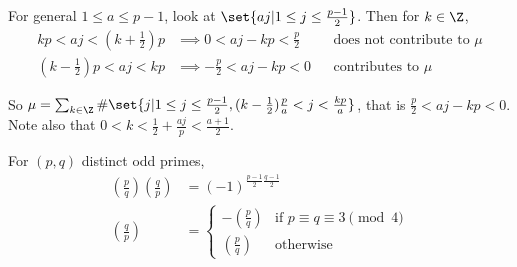 \documentclass{article}
\newcommand{\legendre}[2]{\genfrac{(}{)}{}{}{#1}{#2}}
\begin{document}
For general $1 \leq a \leq p-1$, look at $\set{aj | 1 \leq j \leq \frac{p-1}{2}}$.
Then for $k \in \Z$,
\begin{align*}
    kp < aj < \left(k+ \frac{1}{2}\right) p &\implies 0 < aj - kp < \frac{p}{2} & &\text{does not contribute to $\mu$} \\
    \left(k-\frac{1}{2}\right)p < aj < kp &\implies -\frac{p}{2} < aj - kp < 0 & &\text{contributes to $\mu$}
\end{align*}

So $\mu = \sum_{k \in \Z} \#\set{j | 1 \leq j \leq \frac{p-1}{2}, (k-\frac{1}{2}) \frac{p}{a} < j < \frac{kp}{a}}$, that is $\frac{p}{2} < aj - kp < 0$.
Note also that $0 < k < \frac{1}{2} + \frac{a j}{p} < \frac{a+1}{2}$.

\begin{thm}
    For $(p, q)$ distinct odd primes,
    \begin{align*}
        \legendre{p}{q} \legendre{q}{p} &= (-1)^{\frac{p-1}{2} \frac{q-1}{2}} \\
                        \legendre{q}{p} &=
                        \begin{cases}
                            -\legendre{p}{q} & \text{if } p \equiv q \equiv 3 \pmod{4} \\
                            \legendre{p}{q} & \text{otherwise}
                        \end{cases}
    \end{align*}
\end{thm}
\end{document}
